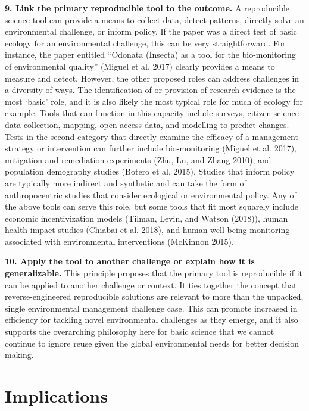 \documentclass[fleqn,10pt]{wlpeerj} %
\begin{document}
\textbf{9. Link the primary reproducible tool to the outcome.} A
reproducible science tool can provide a means to collect data, detect
patterns, directly solve an environmental challenge, or inform policy.
If the paper was a direct test of basic ecology for an environmental
challenge, this can be very straightforward. For instance, the paper
entitled ``Odonata (Insecta) as a tool for the bio-monitoring of
environmental quality'' (Miguel et al. 2017) clearly provides a means to
measure and detect. However, the other proposed roles can address
challenges in a diversity of ways. The identification of or provision of
research evidence is the most `basic' role, and it is also likely the
most typical role for much of ecology for example. Tools that can
function in this capacity include surveys, citizen science data
collection, mapping, open-access data, and modelling to predict changes.
Tests in the second category that directly examine the efficacy of a
management strategy or intervention can further include bio-monitoring
(Miguel et al. 2017), mitigation and remediation experiments (Zhu, Lu,
and Zhang 2010), and population demography studies (Botero et al. 2015).
Studies that inform policy are typically more indirect and synthetic and
can take the form of anthropocentric studies that consider ecological or
environmental policy. Any of the above tools can serve this role, but
some tools that fit most squarely include economic incentivization
models (Tilman, Levin, and Watson (2018)), human health impact studies
(Chiabai et al. 2018), and human well-being monitoring associated with
environmental interventions (McKinnon 2015).

\textbf{10. Apply the tool to another challenge or explain how it is
generalizable.} This principle proposes that the primary tool is
reproducible if it can be applied to another challenge or context. It
ties together the concept that reverse-engineered reproducible solutions
are relevant to more than the unpacked, single environmental management
challenge case. This can promote increased in efficiency for tackling
novel environmental challenges as they emerge, and it also supports the
overarching philosophy here for basic science that we cannot continue to
ignore reuse given the global environmental needs for better decision
making.

\hypertarget{implications}{%
\section*{Implications}\label{implications}}
\end{document}
